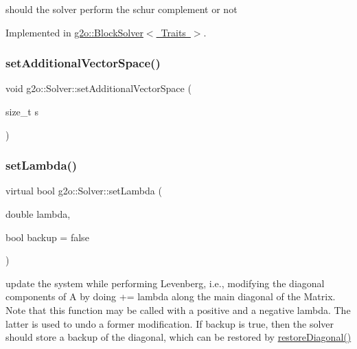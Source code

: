 should the solver perform the schur complement or not 



Implemented in \mbox{\hyperlink{classg2o_1_1_block_solver_a382173946f1dd929a625e3708c959883}{g2o\+::\+Block\+Solver$<$ Traits $>$}}.

\mbox{\label{classg2o_1_1_solver_ad35b33cee11586c8adea12cd6949f74a}} 
\subsubsection{\texorpdfstring{set\+Additional\+Vector\+Space()}{setAdditionalVectorSpace()}}
{\footnotesize\ttfamily void g2o\+::\+Solver\+::set\+Additional\+Vector\+Space (\begin{DoxyParamCaption}\item[{size\+\_\+t}]{s }\end{DoxyParamCaption})}

\mbox{\label{classg2o_1_1_solver_a94a0d5196c7859c6c37fc2368ac56be3}} 
\subsubsection{\texorpdfstring{set\+Lambda()}{setLambda()}}
{\footnotesize\ttfamily virtual bool g2o\+::\+Solver\+::set\+Lambda (\begin{DoxyParamCaption}\item[{double}]{lambda,  }\item[{bool}]{backup = {\ttfamily false} }\end{DoxyParamCaption})\hspace{0.3cm}{\ttfamily [pure virtual]}}

update the system while performing Levenberg, i.\+e., modifying the diagonal components of A by doing += lambda along the main diagonal of the Matrix. Note that this function may be called with a positive and a negative lambda. The latter is used to undo a former modification. If backup is true, then the solver should store a backup of the diagonal, which can be restored by \mbox{\hyperlink{classg2o_1_1_solver_a3c40dae9b999c4d18e57b02fd0e0ade2}{restore\+Diagonal()}} 

